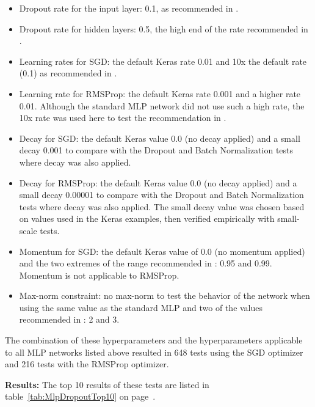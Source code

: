 \documentclass[../dropout-vs-batch-normalization.tex]{subfiles}
\begin{document}
\begin{itemize}
\item Dropout rate for the input layer: 0.1, as recommended in \cite{Srivastava2014}.
\item Dropout rate for hidden layers: 0.5, the high end of the rate recommended in \cite{Srivastava2014}.
\item Learning rates for SGD: the default Keras rate 0.01 and 10x the default rate (0.1) as recommended in \cite{Srivastava2014}.
\item Learning rate for RMSProp: the default Keras rate 0.001 and a higher rate 0.01. Although the standard MLP network did not use such a high rate, the 10x rate was used here to test the recommendation in \cite{Srivastava2014}.
\item Decay for SGD: the default Keras value 0.0 (no decay applied) and a small decay 0.001 to compare with the Dropout and Batch Normalization tests where decay was also applied.
\item Decay for RMSProp: the default Keras value 0.0 (no decay applied) and a small decay 0.00001 to compare with the Dropout and Batch Normalization tests where decay was also applied. The small decay value was chosen based on values used in the Keras examples, then verified empirically with small-scale tests.
\item Momentum for SGD: the default Keras value of 0.0 (no momentum applied) and the two extremes of the range recommended in \cite{Srivastava2014}: 0.95 and 0.99. Momentum is not applicable to RMSProp.
\item Max-norm constraint: no max-norm to test the behavior of the network when using the same value as the standard MLP and two of the values recommended in \cite{Srivastava2014}: 2 and 3.
\end{itemize}

The combination of these hyperparameters and the hyperparameters applicable to all MLP networks listed above resulted in 648 tests using the SGD optimizer and 216 tests with the RMSProp optimizer.

\medskip
\noindent\textbf{Results:} The top 10 results of these tests are listed in table~\ref{tab:MlpDropoutTop10} on page~\pageref{tab:MlpDropoutTop10}.
\end{document}
